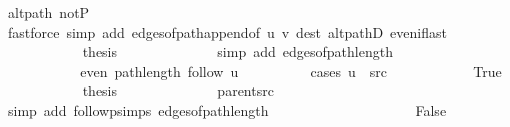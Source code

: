 \begin{isabellebody}
\ alt{\isacharunderscore}{\kern0pt}path\ not{\isacharunderscore}{\kern0pt}P{\isacharprime}{\kern0pt}{\isacharprime}{\kern0pt}\isanewline
\ \ \ \ \ \ \ \ \ \ \ \ \isamarkupfalse%
\ {\isacharparenleft}{\kern0pt}fastforce\ simp\ add{\isacharcolon}{\kern0pt}\ edges{\isacharunderscore}{\kern0pt}of{\isacharunderscore}{\kern0pt}path{\isacharunderscore}{\kern0pt}append{\isacharunderscore}{\kern0pt}{}{\isacharbrackleft}{\kern0pt}of\ {\isachardoublequoteopen}{\isacharbrackleft}{\kern0pt}u{\isacharcomma}{\kern0pt}\ v{\isacharbrackright}{\kern0pt}{\isachardoublequoteclose}{\isacharbrackright}{\kern0pt}\ dest{\isacharcolon}{\kern0pt}\ alt{\isacharunderscore}{\kern0pt}pathD{\isacharparenleft}{\kern0pt}{}{\isacharparenright}{\kern0pt}\ even{\isacharunderscore}{\kern0pt}if{\isacharunderscore}{\kern0pt}last{\isacharparenright}{\kern0pt}\isanewline
\ \ \ \ \ \ \ \ \ \ \isamarkupfalse%
\ {\isacharquery}{\kern0pt}thesis\isanewline
\ \ \ \ \ \ \ \ \ \ \ \ \isamarkupfalse%
\ {\isacharparenleft}{\kern0pt}simp\ add{\isacharcolon}{\kern0pt}\ edges{\isacharunderscore}{\kern0pt}of{\isacharunderscore}{\kern0pt}path{\isacharunderscore}{\kern0pt}length{\isacharparenright}{\kern0pt}\isanewline
\ \ \ \ \ \ \ \ \isamarkupfalse%
\isanewline
\ \ \ \ \ \ \ \ \isamarkupfalse%
\ \isamarkupfalse%
\ {\isachardoublequoteopen}even\ {\isacharparenleft}{\kern0pt}path{\isacharunderscore}{\kern0pt}length\ {\isacharparenleft}{\kern0pt}follow\ u{\isacharparenright}{\kern0pt}{\isacharparenright}{\kern0pt}{\isachardoublequoteclose}\isanewline
\ \ \ \ \ \ \ \ \isamarkupfalse%
\ {\isacharparenleft}{\kern0pt}cases\ {\isachardoublequoteopen}u\ {\isacharequal}{\kern0pt}\ src{\isachardoublequoteclose}{\isacharparenright}{\kern0pt}\isanewline
\ \ \ \ \ \ \ \ \ \ \isamarkupfalse%
\ True\isanewline
\ \ \ \ \ \ \ \ \ \ \isamarkupfalse%
\ {\isacharquery}{\kern0pt}thesis\isanewline
\ \ \ \ \ \ \ \ \ \ \ \ \isamarkupfalse%
\ parent{\isacharunderscore}{\kern0pt}src\isanewline
\ \ \ \ \ \ \ \ \ \ \ \ \isamarkupfalse%
\ {\isacharparenleft}{\kern0pt}simp\ add{\isacharcolon}{\kern0pt}\ follow{\isacharunderscore}{\kern0pt}psimps\ edges{\isacharunderscore}{\kern0pt}of{\isacharunderscore}{\kern0pt}path{\isacharunderscore}{\kern0pt}length{\isacharparenright}{\kern0pt}\isanewline
\ \ \ \ \ \ \ \ \isamarkupfalse%
\isanewline
\ \ \ \ \ \ \ \ \ \ \isamarkupfalse%
\ False\isanewline
\ \ \ \ \ \ \ \ \ \ \isamarkupfalse%

\end{isabellebody}
